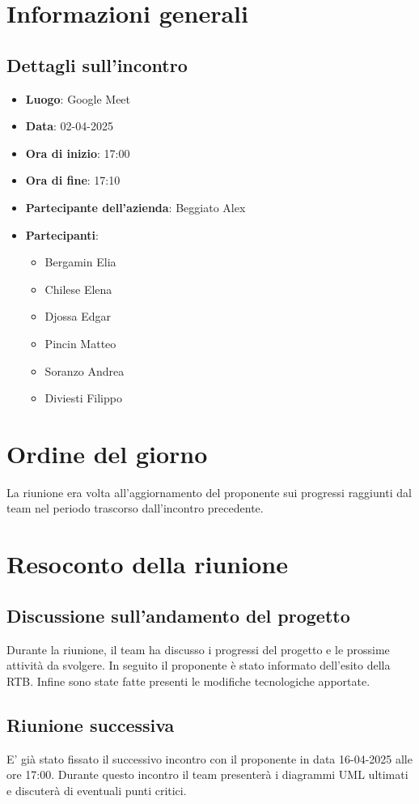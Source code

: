 \section{Informazioni generali}
\subsection{Dettagli sull'incontro}
\begin{itemize}
    \item \textbf{Luogo}: Google Meet
    \item \textbf{Data}: 02-04-2025
    \item \textbf{Ora di inizio}: 17:00
    \item \textbf{Ora di fine}: 17:10
    \item \textbf{Partecipante dell'azienda}: Beggiato Alex
    \item \textbf{Partecipanti}:
    \begin{itemize}
        \item Bergamin Elia
        \item Chilese Elena
        \item Djossa Edgar
        \item Pincin Matteo 
        \item Soranzo Andrea
        \item Diviesti Filippo  
    \end{itemize}
\end{itemize}

\section{Ordine del giorno}
La riunione era volta all'aggiornamento del proponente sui progressi raggiunti dal team nel periodo trascorso dall'incontro precedente.

\section{Resoconto della riunione}
\subsection{Discussione sull'andamento del progetto}
Durante la riunione, il team ha discusso i progressi del progetto e le prossime attività da svolgere. In seguito il proponente è stato informato dell'esito della RTB. Infine sono state fatte presenti le
modifiche tecnologiche apportate.

\subsection{Riunione successiva}
E' già stato fissato il successivo incontro con il proponente in data 16-04-2025 alle ore 17:00.
Durante questo incontro il team presenterà i diagrammi UML ultimati e discuterà di eventuali punti critici.

